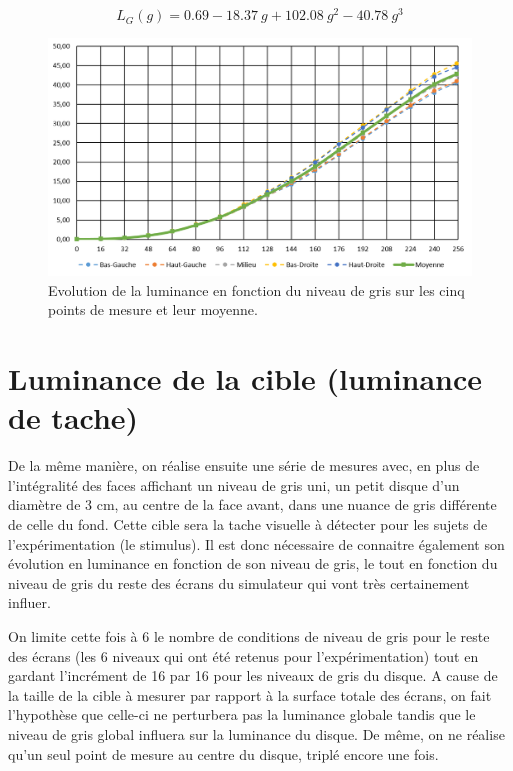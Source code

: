 	\begin{equation}
		L_G(g) = 0.69 - 18.37~g + 102.08~g^2 -40.78~g^3
		\label{eq:regression_luminance_globale}
	\end{equation}
	
	\begin{figure}
		\centering
		\includegraphics[scale=.75]{Figures/EvolutionLuminanceGlobale}
		\caption{Evolution de la luminance en fonction du niveau de gris sur les cinq points de mesure et leur moyenne.}
		\label{fig:evolution_luminance_background}
	\end{figure}
	
	\section{Luminance de la cible (luminance de tache)}
	\par De la même manière, on réalise ensuite une série de mesures avec, en plus de l'intégralité des faces affichant un niveau de gris uni, un petit disque d'un diamètre de 3 cm, au centre de la face avant, dans une nuance de gris différente de celle du fond. Cette cible sera la tache visuelle à détecter pour les sujets de l'expérimentation (le stimulus). Il est donc nécessaire de connaitre également son évolution en luminance en fonction de son niveau de gris, le tout en fonction du niveau de gris du reste des écrans du simulateur qui vont très certainement influer.
	
	\par On limite cette fois à 6 le nombre de conditions de niveau de gris pour le reste des écrans (les 6 niveaux qui ont été retenus pour l'expérimentation) tout en gardant l'incrément de 16 par 16 pour les niveaux de gris du disque. A cause de la taille de la cible à mesurer par rapport à la surface totale des écrans, on fait l'hypothèse que celle-ci ne perturbera pas la luminance globale tandis que le niveau de gris global influera sur la luminance du disque. De même, on ne réalise qu'un seul point de mesure au centre du disque, triplé encore une fois.
	
